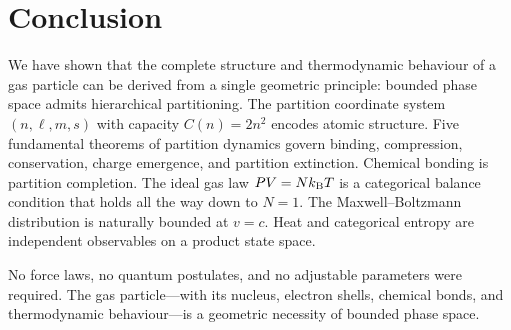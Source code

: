 \section{Conclusion}
\label{sec:conclusion}

We have shown that the complete structure and thermodynamic behaviour of a gas particle can be derived from a single geometric principle: bounded phase space admits hierarchical partitioning. The partition coordinate system $(n, \ell, m, s)$ with capacity $C(n) = 2n^2$ encodes atomic structure. Five fundamental theorems of partition dynamics govern binding, compression, conservation, charge emergence, and partition extinction. Chemical bonding is partition completion. The ideal gas law $PV = Nk_{\mathrm{B}} T$ is a categorical balance condition that holds all the way down to $N = 1$. The Maxwell--Boltzmann distribution is naturally bounded at $v = c$. Heat and categorical entropy are independent observables on a product state space.

No force laws, no quantum postulates, and no adjustable parameters were required. The gas particle---with its nucleus, electron shells, chemical bonds, and thermodynamic behaviour---is a geometric necessity of bounded phase space.

